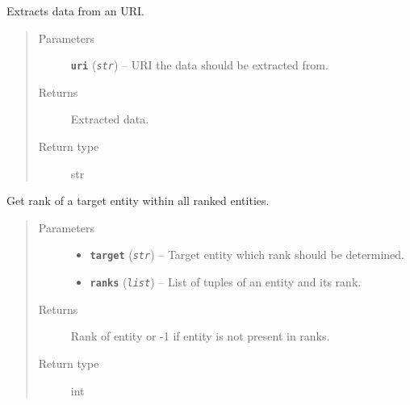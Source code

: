 \documentclass[letterpaper,10pt,english]{sphinxmanual}
\begin{document}
\begin{fulllineitems}
\label{src.trans_e:src.trans_e.trans_we.extract_data_from_uri}
Extracts data from an URI.
\begin{quote}\begin{description}
\item[{Parameters}] \leavevmode
\textbf{\texttt{uri}} (\emph{\texttt{str}}) -- URI the data should be extracted from.

\item[{Returns}] \leavevmode
Extracted data.

\item[{Return type}] \leavevmode
str

\end{description}\end{quote}

\end{fulllineitems}


\begin{fulllineitems}
\label{src.trans_e:src.trans_e.trans_we.get_rank}
Get rank of a target entity within all ranked entities.
\begin{quote}\begin{description}
\item[{Parameters}] \leavevmode\begin{itemize}
\item {} 
\textbf{\texttt{target}} (\emph{\texttt{str}}) -- Target entity which rank should be determined.

\item {} 
\textbf{\texttt{ranks}} (\emph{\texttt{list}}) -- List of tuples of an entity and its rank.

\end{itemize}

\item[{Returns}] \leavevmode
Rank of entity or -1 if entity is not present in ranks.

\item[{Return type}] \leavevmode
int

\end{description}\end{quote}

\end{fulllineitems}
\end{document}

